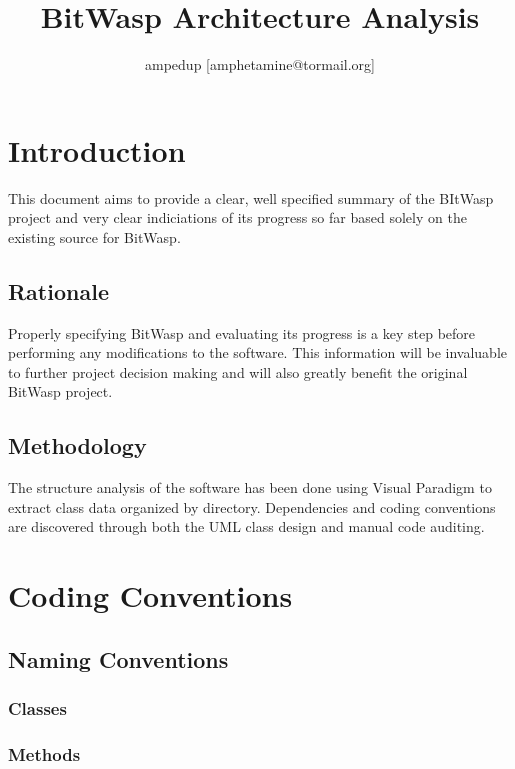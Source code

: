 \documentclass[11pt]{article} %
\title{BitWasp Architecture Analysis}
\author{ampedup [amphetamine@tormail.org]}
\date{} %
\begin{document}
\maketitle

\newpage

\tableofcontents

\newpage

\section{Introduction}

This document aims to provide a clear, well specified summary of the BItWasp project and very clear indiciations of its progress so far based solely on the existing source for BitWasp.

\subsection{Rationale}

Properly specifying BitWasp and evaluating its progress is a key step before performing any modifications to the software. This information will be invaluable to further project decision making and will also greatly benefit the original BitWasp project.

\subsection{Methodology}

The structure analysis of the software has been done using Visual Paradigm to extract class data organized by directory. Dependencies and coding conventions are discovered through both the UML class design and manual code auditing. 

\newpage

\section{Coding Conventions}
\subsection{Naming Conventions}
\subsubsection{Classes}
\subsubsection{Methods}
\end{document}
